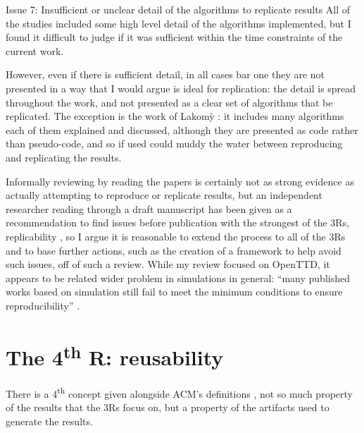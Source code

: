 \documentclass[logo,msc,dsti]{style/infthesis}    %
\begin{document}
{\begin{itemize}
\begin{descitem}{Issue 7: Insufficient or unclear detail of the algorithms to replicate results}
All of the studies included some high level detail of the algorithms implemented, but I found it difficult to judge if it was sufficient within the time constraints of the current work.

However, even if there is sufficient detail, in all cases bar one they are not presented in a way that I would argue is ideal for replication: the detail is spread throughout the work, and not presented as a clear set of algorithms that be replicated. The exception is the work of {Lakom{\`y}} \cite{lakomy2020railroad}: it includes many algorithms each of them explained and discussed, although they are presented as code rather than pseudo-code, and so if used could muddy the water between reproducing and replicating the results.
\end{descitem}

\end{itemize}

Informally reviewing by reading the papers is certainly not as strong evidence as actually attempting to reproduce or replicate results, but an independent researcher reading through a draft manuscript has been given as a recommendation to find issues before publication with the strongest of the 3Rs, replicability \cite{luijken2024replicability}, so I argue it is reasonable to extend the process to all of the 3Rs and to base further actions, such as the creation of a framework to help avoid such issues, off of such a review. While my review focused on OpenTTD, it appears to be related wider problem in simulations in general: ``many published works based on simulation still fail to meet the minimum conditions to ensure reproducibility'' \cite{dalle2012reproducibility}.

\section{The 4\texorpdfstring{\textsuperscript{th}}{th} R: reusability}

There is a 4\textsuperscript{th} concept given alongside ACM's definitions \cite{association_for_computing_machiner_new_2020}, not so much property of the results that the 3Rs focus on, but a property of the artifacts used to generate the results.

}
\end{document}

